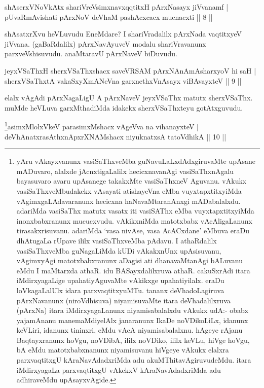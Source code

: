 
\begin{shl}
shAserxVNoVkAtx shariVreV\s simxnavxqqtitxH pArxNasayx jiVvanamf | \\
pUvaRmAvishati pArxNoV deVhaM pashAcxcacx mucnacxti \hfill|| 8 || 
\end{shl}

\begin{artha} 
shAsatxrXvu heVLuvudu EneMdare? I shariVradalilx pArxNada vaqtitxyeV 
jiVvana. (gaBaRdalilx) pArxNavAyuveV modalu shariVravanunx 
parxveVshisuvudu. anaMtaravU pArxNaveV biDuvudu.
\end{artha}

\begin{shl}
jeyxVSaThxH sherxVSaThxshacx saveVRSAM pArxNAnAmAsharxyoV hi saH | \\
sherxVSaThxtA vakaSxyXmANeVna garxnethxVnAsayx viBAvayxteV \hfill|| 9 || 
\end{shl}

\begin{artha} 
elalx vAgAdi pArxNagaLigU A pArxNaveV jeyxVSaThx matutx sherxVSaThx. 
muMde heVLuva garxMthadiMda idakekx sherxVSaThxteyu gotAtxguvudu.
\end{artha}


\begin{shl}
\footnote{yAru vAkayxvanunx vasiSaThxveMba guNavuLaLxdAdxgiruvaMte upAsane mADuvaro, alalxde jAcnxtigaLalilx hecicxnavanAgi vasiSaThxnAgalu bayasuvaro avaru upAsanege takakxMte vasiSaThxneV Aguvanu. vAkukx vasiSaThxveMbudakekx vAsayati atishayeVna eMba vuyxtapxtitxyiMda vAgimxgaLAdavaranunx hecicxna haNavaMtaranAnxgi mADabalalxdu. adariMda vasiSaThx matutx vasatx iti vasiSAThx eMba vuyxtapxtitxyiMda inonxbabxranunx mucucxvudu. vAkikxniMda matotxbabx vAcAligaLanunx tirasakxrisuvanu. adariMda `vasa nivAse, vasa AcACxdane' eMbuva eraDu dhAtugaLa rUpave ililx vasiSaThxveMba pAdavu. I athaRdalilx vasiSaThxveMba guNagaLiMda kUDi vAkakxnUnx upAsisuvanu, vAgimxyAgi matotxbabxranunx aDagisi ati dhanavaMtanAgi bALuvanu eMdu I maMtarxda athaR. idu BASayxdalilxruva athaR. cakuSxrAdi itara iMdirxyagaLige upahatiyAguvaMte vAkikxge upahatiyilalx. eraDu loVkagaLalUlx idara parxvaqtitxyuMTu. tananx deVhadoLagiruva pArxNavanunx (niroVdhisuva) niyamisuvaMte itara deVhadalilxruva (pArxNa) itara iMdirxyagaLanunx niyamisabalalxdu vAkukx udA:- obabx yajamAnanu manemaMdiyelAlx janaranunx IkaDe noVDikoLiLx, idanunx keVLiri, idanunx tininxri, eMdu vAcA niyamisabalalxnu. hAgeye rAjanu Baqtayxranunx hoVgu, noVDibA, ililx noVDiko, ililx keVLu, hiVge hoVgu, bA eMdu matotxbabxnanunx niyamisuvanu hiVgeye vAkukx elalxra parxvaqtitxgU kAraNavAdadxriMda adu akuMThitavAgiruvudeMdu. itara iMdirxyagaLa parxvaqtitxgU vAkekxV kAraNavAdadxriMda adu adhiraveMdu upAsayxvAgide.}asimxMlolxVkeV parasimxMshacx vAgeVva na vihanayxteV | \\
deVhAnatxrasAthxnApxrXNAMshacx niyuknatx\s sA tatoV\s dhikA \hfill|| 10 || 
\end{shl}

